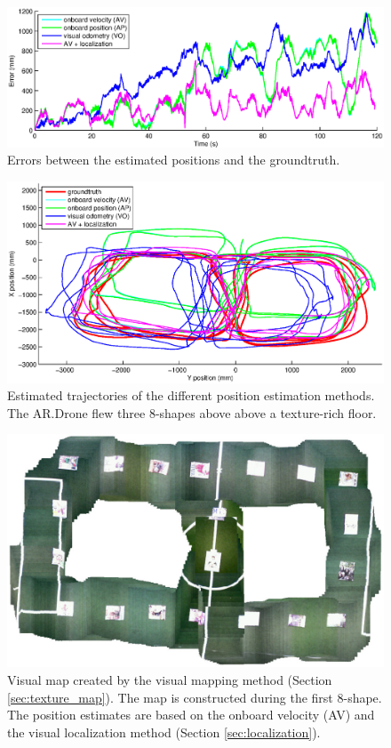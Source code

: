 
\begin{figure}[htb!]
\centering
\includegraphics[width=\linewidth]{images/exp1-run13-error.eps}
\caption{Errors between the estimated positions and the groundtruth.}
\label{fig:exp1-texture-error}
\end{figure}

\begin{figure}[htb!]
\centering
\includegraphics[width=\linewidth]{images/exp1-run13-path.eps}
\caption{Estimated trajectories of the different position estimation methods. The AR.Drone flew three 8-shapes above above a texture-rich floor.}
\label{fig:exp1-texture-path}
\end{figure}

\begin{figure}[htb!]
\centering
\includegraphics[width=0.75\linewidth]{images/exp1-run13-map.jpg}
\caption{Visual map created by the visual mapping method (Section \ref{sec:texture_map}). The map is constructed during the first 8-shape. The position estimates are based on the onboard velocity (AV) and the visual localization method (Section \ref{sec:localization}).}
\label{fig:exp1-texture-map}
\end{figure}




